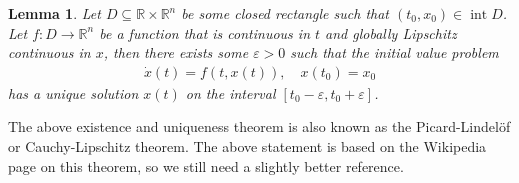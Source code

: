 \documentclass[a4paper]{article}
\theoremstyle{definition}
\theoremstyle{plain}
\newtheorem{lemma}{Lemma\hspace{0.25em}\ignorespaces}
\DeclareMathOperator{\interior}{int}
\begin{document}
\begin{lemma}\label{lemma:picard}
  Let $D \subseteq \mathbb{R} \times \mathbb{R}^{n}$ be some closed rectangle such that
  $(t_{0}, x_{0}) \in \interior D$.
  Let $f : D \rightarrow \mathbb{R}^{n}$ be a function that is continuous in $t$
  and globally Lipschitz continuous in $x$, then there exists some $\varepsilon > 0$
  such that the initial value problem
  \begin{align}
    \label{eq:1}
    \dot{x}(t) = f(t, x(t)), \quad x(t_{0}) = x_{0}
  \end{align}
  has a unique solution $x(t)$ on the interval
  $[t_{0} - \varepsilon, t_{0} + \varepsilon]$.
\end{lemma}

{\color{Navy} The above existence and uniqueness theorem is also known as the
  Picard-Lindel{\"o}f or Cauchy-Lipschitz theorem. The above statement is based
  on the Wikipedia page on this theorem, so we still need a slightly better
  reference.}
\end{document}
